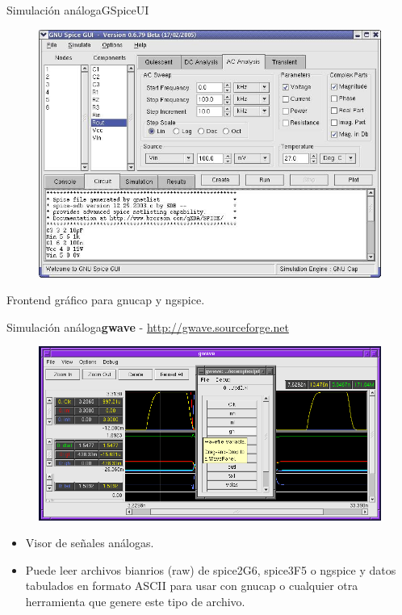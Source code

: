 \documentclass{beamer}
\begin{document}
\begin{frame}{Simulación análoga}{GSpiceUI}
  \begin{figure}[!h]
    \centering
    \includegraphics[scale=0.3]{img/GSpiceUI.jpg}
  \end{figure}
  Frontend gráfico para gnucap y ngspice.
\end{frame}

\begin{frame}{Simulación análoga}{\textbf{gwave} - \url{http://gwave.sourceforge.net}}
  \begin{figure}[!h]
    \centering
    \includegraphics[scale=0.25]{img/gwave.png}
  \end{figure}
  \begin{itemize}
  \item Visor de señales análogas.
  \item Puede leer archivos bianrios (raw) de spice2G6, spice3F5 o ngspice y datos tabulados en formato ASCII para usar con gnucap o cualquier otra herramienta que genere este tipo de archivo.
  \end{itemize}
\end{frame}
\end{document}
